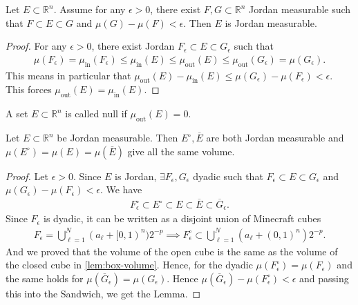 \begin{lemma}[Sandwich]\label{lem:sandwich}
    Let $E \subset \mathbb{R}^{n}$. Assume for any $\epsilon > 0$, there exist $F, G \subset \mathbb{R}^{n}$ Jordan measurable such that $F \subset E \subset G$ and $\mu(G) - \mu(F) < \epsilon$. Then $E$ is Jordan measurable. 
\end{lemma}
\begin{proof}
    For any $\epsilon > 0$, there exist Jordan $F_{\epsilon} \subset E \subset G_{\epsilon}$ such that
    \begin{align*}
        \mu(F_{\epsilon}) = \mu_{\text{in}}(F_{\epsilon}) \leq \mu_{\text{in}}(E) \leq \mu_{\text{out}}(E) \leq \mu_{\text{out}}(G_{\epsilon}) = \mu(G_{\epsilon}).
    \end{align*}
    This means in particular that $\mu_{\text{out}}(E) - \mu_{\text{in}}(E) \leq \mu(G_{\epsilon}) - \mu(F_{\epsilon}) < \epsilon$. This forces $\mu_{\text{out}}(E) = \mu_{\text{in}}(E)$.
\end{proof}

\begin{definition}\label{def:jordan-null-set}
    A set $E \subset \mathbb{R}^{n}$ is called null if $\mu_{\text{out}}(E) = 0$.
\end{definition}

\begin{lemma}\label{lem:jord-clos-int}
    Let $E \subset \mathbb{R}^{n}$ be Jordan measurable. Then $E^{\circ }, \overline{ E }$ are both Jordan measurable and $\mu(E^{\circ }) = \mu(E) = \mu(\overline{ E } )$ give all the same volume.
\end{lemma}
\begin{proof}
    Let $\epsilon > 0$. Since $E$ is Jordan, $\exists F_{\epsilon}, G_{\epsilon}$ dyadic such that $F_{\epsilon} \subset E \subset G_{\epsilon}$ and $\mu(G_{\epsilon}) - \mu(F_{\epsilon}) < \epsilon$. We have
    \begin{align*}
        F_{\epsilon}^{\circ } \subset E^{\circ } \subset E \subset \overline{ E }  \subset \overline{ G }_{\epsilon}.
    \end{align*}
    Since $F_{\epsilon}$ is dyadic, it can be written as a disjoint union of Minecraft cubes
    \begin{align*}
        F_{\epsilon} = \bigcup_{\ell = 1}^{N} (a_{\ell} + [0,1)^{n})2^{-p} \implies F_{\epsilon}^{\circ } \subset \bigcup_{\ell=1}^{N} (a_{\ell} + (0,1)^{n})2^{-p}.
    \end{align*}
    And we proved that the volume of the open cube is the same as the volume of the closed cube in \ref{lem:box-volume}. Hence, for the dyadic $\mu(F_{\epsilon}^{\circ }) = \mu(F_{\epsilon})$ and the same holds for $\mu(\overline{ G }_{\epsilon}) = \mu(G_{\epsilon})$. Hence $\mu(\overline{ G }_{\epsilon}) - \mu(F_{\epsilon}^{\circ }) < \epsilon$ and passing this into the Sandwich, we get the Lemma.
\end{proof}

